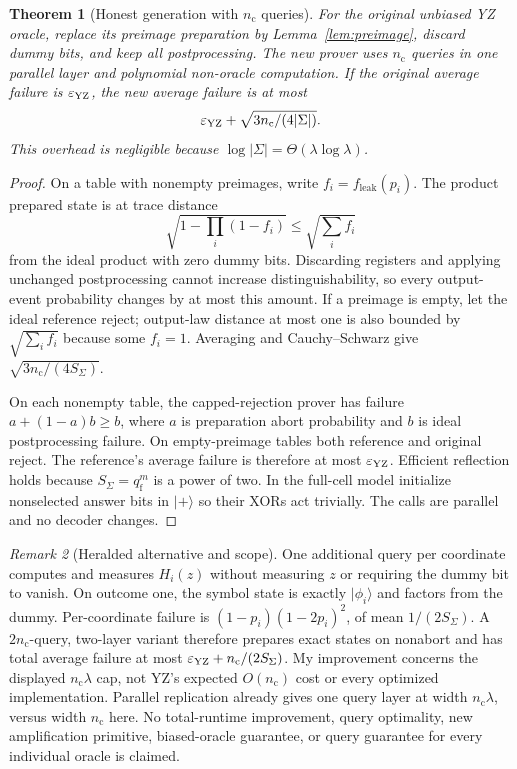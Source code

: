 \documentclass[11pt]{article}
\newtheorem{theorem}{Theorem}[section]
\theoremstyle{definition}\newtheorem{definition}[theorem]{Definition}
\theoremstyle{remark}\newtheorem{remark}[theorem]{Remark}
\begin{document}
\begin{theorem}[Honest generation with \(n_{\mathrm c}\) queries]\label{thm:honest}
For the original unbiased YZ oracle, replace its preimage preparation by Lemma~\ref{lem:preimage}, discard dummy bits, and keep all postprocessing. The new prover uses \(n_{\mathrm c}\) queries in one parallel layer and polynomial non-oracle computation. If the original average failure is \(\varepsilon_{\mathrm{YZ}}\), the new average failure is at most
\[
 \varepsilon_{\mathrm{YZ}}+\sqrt{3n_{\mathrm c}/(4|\Sigma|)}.
\]
This overhead is negligible because \(\log|\Sigma|=\Theta(\lambda\log\lambda)\).
\end{theorem}
\begin{proof}
On a table with nonempty preimages, write \(f_i=f_{\mathrm{leak}}(p_i)\). The product prepared state is at trace distance
\[
 \sqrt{1-\prod_i(1-f_i)}\le\sqrt{\sum_if_i}
\]
from the ideal product with zero dummy bits. Discarding registers and applying unchanged postprocessing cannot increase distinguishability, so every output-event probability changes by at most this amount. If a preimage is empty, let the ideal reference reject; output-law distance at most one is also bounded by \(\sqrt{\sum_if_i}\) because some \(f_i=1\). Averaging and Cauchy--Schwarz give \(\sqrt{3n_{\mathrm c}/(4S_\Sigma)}\).

On each nonempty table, the capped-rejection prover has failure \(a+(1-a)b\ge b\), where \(a\) is preparation abort probability and \(b\) is ideal postprocessing failure. On empty-preimage tables both reference and original reject. The reference's average failure is therefore at most \(\varepsilon_{\mathrm{YZ}}\). Efficient reflection holds because \(S_\Sigma=q_{\mathrm f}^m\) is a power of two. In the full-cell model initialize nonselected answer bits in \(|+\rangle\) so their XORs act trivially. The calls are parallel and no decoder changes.
\end{proof}

\begin{remark}[Heralded alternative and scope]
One additional query per coordinate computes and measures \(H_i(z)\) without measuring \(z\) or requiring the dummy bit to vanish. On outcome one, the symbol state is exactly \(|\phi_i\rangle\) and factors from the dummy. Per-coordinate failure is \((1-p_i)(1-2p_i)^2\), of mean \(1/(2S_\Sigma)\). A \(2n_{\mathrm c}\)-query, two-layer variant therefore prepares exact states on nonabort and has total average failure at most \(\varepsilon_{\mathrm{YZ}}+n_{\mathrm c}/(2S_\Sigma)\). My improvement concerns the displayed \(n_{\mathrm c}\lambda\) cap, not YZ's expected \(O(n_{\mathrm c})\) cost or every optimized implementation. Parallel replication already gives one query layer at width \(n_{\mathrm c}\lambda\), versus width \(n_{\mathrm c}\) here. No total-runtime improvement, query optimality, new amplification primitive, biased-oracle guarantee, or query guarantee for every individual oracle is claimed.
\end{remark}
\end{document}
